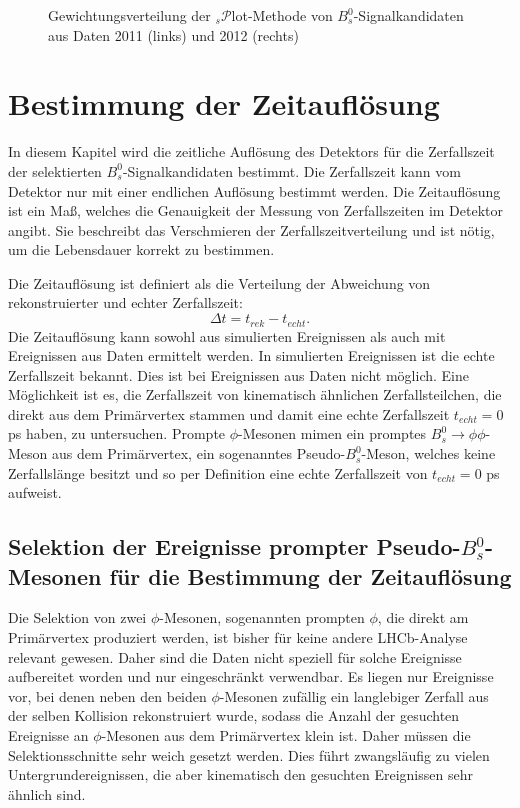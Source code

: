 \documentclass{article}
\begin{document}
\begin{figure}[h!]
\caption{Gewichtungsverteilung der $_s\mathcal{P}$lot-Methode von $B_s^0$-Signalkandidaten aus Daten 2011 (links) und 2012 (rechts)}
\label{fig:sweights}
\end{figure} 


\newpage
\section{Bestimmung der Zeitauflösung}
In diesem Kapitel wird die zeitliche Auflösung des Detektors für die Zerfallszeit der selektierten $B_s^0$-Signalkandidaten bestimmt. Die Zerfallszeit kann vom Detektor nur mit einer endlichen Auflösung bestimmt werden. Die Zeitauflösung ist ein Maß, welches die Genauigkeit der Messung von Zerfallszeiten im Detektor angibt. Sie beschreibt das Verschmieren der Zerfallszeitverteilung und ist nötig, um die Lebensdauer korrekt zu bestimmen.

Die Zeitauflösung ist definiert als die Verteilung der Abweichung von rekonstruierter und echter Zerfallszeit:
 \[\Delta t=t_{rek}-t_{echt}.\]
Die Zeitauflösung kann sowohl aus simulierten Ereignissen als auch mit Ereignissen aus Daten ermittelt werden. In simulierten Ereignissen ist die echte Zerfallszeit bekannt. Dies ist bei Ereignissen aus Daten nicht möglich. Eine Möglichkeit ist es, die Zerfallszeit von kinematisch ähnlichen Zerfallsteilchen, die direkt aus dem Primärvertex stammen und damit eine echte Zerfallszeit $t_{echt}=0$ ps haben, zu untersuchen. Prompte $\phi$-Mesonen mimen ein promptes $B_s^0\rightarrow\phi\phi$-Meson aus dem Primärvertex, ein sogenanntes Pseudo-$B_s^0$-Meson, welches keine Zerfallslänge besitzt und so per Definition eine echte Zerfallszeit von $t_{echt}=0$ ps aufweist.


\subsection{Selektion der Ereignisse prompter Pseudo-$B_s^0$-Mesonen für die Bestimmung der Zeitauflösung}
\label{ch:selphi}
Die Selektion von zwei $\phi$-Mesonen, sogenannten prompten $\phi$, die direkt am Primärvertex produziert werden, ist bisher für keine andere LHCb-Analyse relevant gewesen. Daher sind die Daten nicht speziell für solche Ereignisse aufbereitet worden und nur eingeschränkt verwendbar. Es liegen nur Ereignisse vor, bei denen neben den beiden $\phi$-Mesonen zufällig ein langlebiger Zerfall aus der selben Kollision rekonstruiert wurde, sodass die Anzahl der gesuchten Ereignisse an $\phi$-Mesonen aus dem Primärvertex klein ist. Daher müssen die Selektionsschnitte sehr weich gesetzt werden. Dies führt zwangsläufig zu vielen Untergrundereignissen, die aber kinematisch den gesuchten Ereignissen sehr ähnlich sind. 
\end{document}
